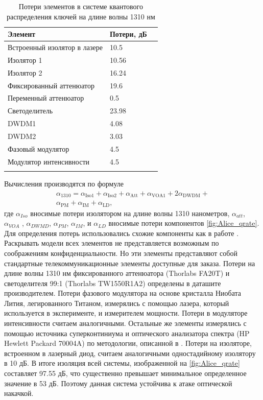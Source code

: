 \begin{table}
    \caption{Потери элементов в системе квантового распределения ключей на длине волны 1310 нм}
    \centering
     \label{tab:isolation1310}
\begin{tabular}[t]{lll}
    \hline\hline
    Элемент & Потери, дБ  \\
    \hline
    Встроенный изолятор в лазере &10.5 \\
    Изолятор 1  & 10.56 &  \\
    Изолятор  2 & 16.24 &  \\
    Фиксированный аттенюатор & 19.6  \\
    Переменный аттенюатор & 0.5 \\
    Светоделитель & 23.98 \\
    DWDM1  & 4.08  \\
    DWDM2  & 3.03  \\
    Фазовый модулятор & 4.5  \\
    Модулятор интенсивности & 4.5 \\
    \hline\hline
    \centering
    \end{tabular}
\end{table}

Вычисления производятся по формуле 
\begin{equation}
    \begin{split}
    \alpha_{1310}=\alpha_\text{Iso1} + \alpha_\text{Iso2} + \alpha_\text{Att} + \alpha_\text{VOA1} + 2\alpha_\text{DWDM} +\\
     \alpha_\text{PM} + \alpha_\text{IM} + \alpha_\text{LD},
     \end{split}
    \label{eq:input power}
\end{equation}
где $\alpha_{Iso}$ вносимые потери изолятором на длине волны 1310 нанометров, $\alpha_{att}$, $\alpha_{VOA}$ , $\alpha_{DWMD}$, $\alpha_{PM}$, $\alpha_{IM}$, и $\alpha_{LD}$ вносимые потери компонентов \ref{fig:Alice_qrate}.
Для определения потерь использовались схожие компоненты как в работе \cite{makarov2023}. Раскрывать модели всех элементов не представляется возможным по соображениям конфиденциальности. 
Но эти элементы представляют собой стандартные телекоммуникационные элементы доступные для заказа. Потери на длине волны 1310 нм фиксированного аттенюатора (Thorlabs FA20T) и светоделителя 99:1 (Thorlabs TW1550R1A2) определены в даташите производителем.
Потери фазового модулятора на основе кристалла Ниобата Лития, легированного Титаном, измерялись с помощью лазера, который используется в эксперименте, и измерителем мощности. Потери в модуляторе интенсивности считаем аналогичными.
Остальные же элементы измерялись с помощью источника суперконтиниума и оптического анализатора спектра (HP Hewlett Packard 70004A) по методологии, описанной в \cite{makarov2023}. Потери на изоляторе, встроенном в лазерный диод, считаем аналогичными одностадийному изолятору в 10 дБ.
В итоге изоляция всей системы, изображенной на \cref{fig:Alice_qrate} составляет 97.55 дБ, что существенно превышает минимальное определенное значение в 53 дБ. Поэтому данная система устойчива к атаке оптической накачкой. 



